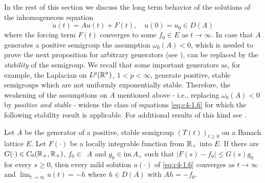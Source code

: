 In the rest of this section we discuss the long term behavior of the solutions of the inhomogeneous equation
\begin{equation}\label{eq:c4-1.6}
\dot{u}(t) = Au(t) + F(t), \quad u(0) = u_{0} \in D(A)
\end{equation}
where the forcing term $F(t)$ converges to some $f_{0} \in E$ as $t \to \infty$.
In case that $A$ generates a positive semigroup the assumption \emph{$\omega_{0}(A) < 0$}, which is needed to prove the next proposition for arbitrary generators (see \citet[ Theorem~4.4.4]{pazy:1983}), can be replaced by the \emph{stability} of the semigroup.
We recall that some important generators as, for example, the Laplacian on $L^{p}(\mathbb{R}^{n})$, $1 < p < \infty$, generate positive, stable semigroups which are not uniformly exponentially stable.
Therefore, the weakening of the assumptions on $A$ mentioned above - i.e., replacing \emph{$\omega_{0}(A) < 0$} by \emph{positive and stable} - widens the class of equations \ref{eq:c4-1.6} for which the following stability result is applicable.
For additional results of this kind see \citet{neubrander:1985b}.


\begin{proposition}\label{prop:c4-1.11}
Let $A$ be the generator of a positive, stable semigroup $(T(t))_{t \geq 0}$ on a Banach lattice $E$.
Let $F(\cdot)$ be a locally integrable function from $\mathbb{R}_{+}$ into $E$.
If there are $G(\cdot) \in C_{0}(\mathbb{R}_{+},\mathbb{R}_{+})$, $f_{0} \in $  $\, A$ and $g_{0} \in \text{im}\, A_{+}$ such that $|F(s) - f_{0}| \leq G(s)g_{0}$ for every $s \geq 0$, then every mild solution $u(\cdot)$ of \eqref{eq:c4-1.6} converges as $t \to \infty$ and $\lim_{t \to \infty} u(t) = -h$ where $h \in D(A)$ with $Ah = -f_{0}$.
\end{proposition}

